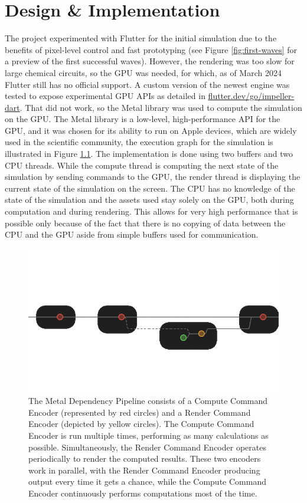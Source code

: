 \chapter{Design \& Implementation}\label{ch:design-implementation}
The project experimented with Flutter for the initial simulation due to the benefits of pixel-level control and fast prototyping (see Figure \ref{fig:first-waves} for a preview of the first successful waves). However, the rendering was too slow for large chemical circuits, so the GPU was needed, for which, as of March 2024 Flutter still has no official support. A custom version of the newest engine was tested to expose experimental GPU APIs as detailed in \href{flutter.dev/go/impeller-dart}{flutter.dev/go/impeller-dart}.
That did not work, so the Metal library was used to compute the simulation on the GPU. 
The Metal library is a low-level, high-performance API for the GPU, and it was chosen for its ability to run on Apple devices, which are widely used in the scientific community, the execution graph for the simulation is illustrated in Figure \ref{fig:metal-dependency-pipline}.
The implementation is done using two buffers and two CPU threads.
While the compute thread is computing the next state of the simulation by sending commands to the GPU,
the render thread is displaying the current state of the simulation on the screen.
The CPU has no knowledge of the state of the simulation and the assets used stay solely on the GPU, both 
during computation and during rendering. This allows for very high performance that is possible only because
of the fact that there is no copying of data between the CPU and the GPU aside from simple buffers used for communication.


\begin{figure}
    \centering
    \includegraphics[width=0.5\linewidth]{metal-pipeline.png}
    \caption{The Metal Dependency Pipeline consists of a Compute Command Encoder (represented by red circles) and a Render Command Encoder (depicted by yellow circles). The Compute Command Encoder is run multiple times, performing as many calculations as possible. Simultaneously, the Render Command Encoder operates periodically to render the computed results. These two encoders work in parallel, with the Render Command Encoder producing output every time it gets a chance, while the Compute Command Encoder continuously performs computations most of the time.}
    \label{fig:metal-dependency-pipline}
\end{figure}

